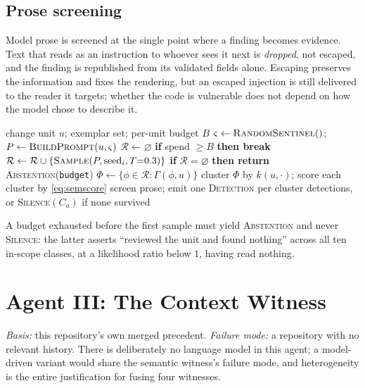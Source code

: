 \documentclass[conference]{IEEEtran}
\newcommand{\Unit}{u}
\begin{document}
\subsection{Prose screening}
Model prose is screened at the single point where a finding becomes evidence. Text that reads
as an instruction to whoever sees it next is \emph{dropped}, not escaped, and the finding is
republished from its validated fields alone. Escaping preserves the information and fixes the
rendering, but an escaped injection is still delivered to the reader it targets; whether the
code is vulnerable does not depend on how the model chose to describe it.

\begin{algorithm}[t]
\caption{\textsc{SemanticHosted}$(\Unit)$}
\label{alg:sem}
\begin{algorithmic}[1]
\Require change unit $\Unit$; exemplar set; per-unit budget $B$
\State $\varsigma \gets \textsc{RandomSentinel}()$;\ \ $P \gets \textsc{BuildPrompt}(\Unit,\varsigma)$
\State $\mathcal{R} \gets \varnothing$
  \State \textbf{if} spend $\ge B$ \textbf{then break}
  \State $\mathcal{R} \gets \mathcal{R} \cup \{\textsc{Sample}(P, \mathrm{seed}_i, T{=}0.3)\}$
\EndFor
\State \textbf{if} $\mathcal{R}=\varnothing$ \textbf{then return} \textsc{Abstention}(\texttt{budget})
\State $\Phi \gets \{\phi \in \mathcal{R} : \Gamma(\phi,\Unit)\}$ 
\State cluster $\Phi$ by $k(\Unit,\cdot)$; score each cluster by \eqref{eq:semscore}
\State screen prose; emit one \textsc{Detection} per cluster
\State \Return detections, or \textsc{Silence}$(C_a)$ if none survived
\end{algorithmic}
\end{algorithm}

A budget exhausted before the first sample must yield \textsc{Abstention} and never
\textsc{Silence}: the latter asserts ``reviewed the unit and found nothing'' across all ten
in-scope classes, at a likelihood ratio below $1$, having read nothing.

\section{Agent III: The Context Witness}

\emph{Basis:} this repository's own merged precedent. \emph{Failure mode:} a repository with
no relevant history. There is deliberately no language model in this agent; a model-driven
variant would share the semantic witness's failure mode, and heterogeneity is the entire
justification for fusing four witnesses.
\end{document}
